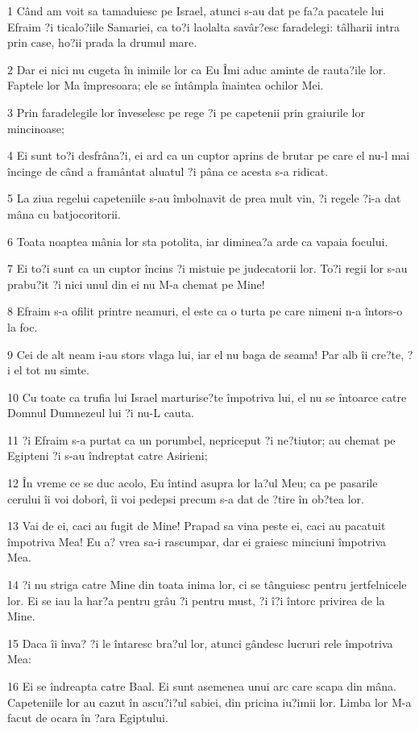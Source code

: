 \par 1 Când am voit sa tamaduiesc pe Israel, atunci s-au dat pe fa?a pacatele lui Efraim ?i ticalo?iile Samariei, ca to?i laolalta savâr?esc faradelegi: tâlharii intra prin case, ho?ii prada la drumul mare.
\par 2 Dar ei nici nu cugeta în inimile lor ca Eu Îmi aduc aminte de rauta?ile lor. Faptele lor Ma împresoara; ele se întâmpla înaintea ochilor Mei.
\par 3 Prin faradelegile lor înveselesc pe rege ?i pe capetenii prin graiurile lor mincinoase;
\par 4 Ei sunt to?i desfrâna?i, ei ard ca un cuptor aprins de brutar pe care el nu-l mai încinge de când a framântat aluatul ?i pâna ce acesta s-a ridicat.
\par 5 La ziua regelui capeteniile s-au îmbolnavit de prea mult vin, ?i regele ?i-a dat mâna cu batjocoritorii.
\par 6 Toata noaptea mânia lor sta potolita, iar diminea?a arde ca vapaia focului.
\par 7 Ei to?i sunt ca un cuptor încins ?i mistuie pe judecatorii lor. To?i regii lor s-au prabu?it ?i nici unul din ei nu M-a chemat pe Mine!
\par 8 Efraim s-a ofilit printre neamuri, el este ca o turta pe care nimeni n-a întors-o la foc.
\par 9 Cei de alt neam i-au stors vlaga lui, iar el nu baga de seama! Par alb îi cre?te, ?i el tot nu simte.
\par 10 Cu toate ca trufia lui Israel marturise?te împotriva lui, el nu se întoarce catre Domnul Dumnezeul lui ?i nu-L cauta.
\par 11 ?i Efraim s-a purtat ca un porumbel, nepriceput ?i ne?tiutor; au chemat pe Egipteni ?i s-au îndreptat catre Asirieni;
\par 12 În vreme ce se duc acolo, Eu întind asupra lor la?ul Meu; ca pe pasarile cerului îi voi doborî, îi voi pedepsi precum s-a dat de ?tire în ob?tea lor.
\par 13 Vai de ei, caci au fugit de Mine! Prapad sa vina peste ei, caci au pacatuit împotriva Mea! Eu a? vrea sa-i rascumpar, dar ei graiesc minciuni împotriva Mea.
\par 14 ?i nu striga catre Mine din toata inima lor, ci se tânguiesc pentru jertfelnicele lor. Ei se iau la har?a pentru grâu ?i pentru must, ?i î?i întorc privirea de la Mine.
\par 15 Daca îi înva? ?i le întaresc bra?ul lor, atunci gândesc lucruri rele împotriva Mea:
\par 16 Ei se îndreapta catre Baal. Ei sunt asemenea unui arc care scapa din mâna. Capeteniile lor au cazut în ascu?i?ul sabiei, din pricina iu?imii lor. Limba lor M-a facut de ocara în ?ara Egiptului.

